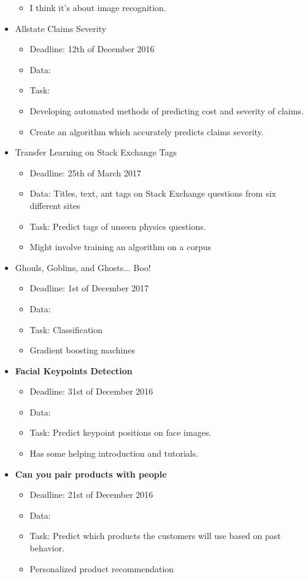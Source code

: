 \documentclass[a4paper,11pt]{article}
\theoremstyle{mytheor}
\begin{document}
\begin{itemize}[noitemsep]
\begin{itemize}[noitemsep]
  \item I think it's about image recognition.
\end{itemize}
\item Allstate Claims Severity
\begin{itemize}[noitemsep]
  \item Deadline: 12th of December 2016
  \item Data:
  \item Task:
  \item Developing automated methods of predicting cost and severity of claims.
  \item Create an algorithm which accurately predicts claims severity.
\end{itemize}

\item Transfer Learning on Stack Exchange Tags
\begin{itemize}[noitemsep]
  \item Deadline: 25th of March 2017
  \item Data: Titles, text, ant tags on Stack Exchange questions from six different sites
  \item Task: Predict tags of unseen physics questions.
  \item Might involve training an algorithm on a corpus
\end{itemize}

\item Ghouls, Goblins, and Ghosts... Boo!
\begin{itemize}[noitemsep]
  \item Deadline: 1st of December 2017
  \item Data: 
  \item Task: Classification 
  \item Gradient boosting machines
\end{itemize}

\item \textbf{Facial Keypoints Detection}
\begin{itemize}[noitemsep]
  \item Deadline: 31st of December 2016
  \item Data: 
  \item Task: Predict keypoint positions on face images. 
  \item Has some helping introduction and tutorials.
\end{itemize}

\item \textbf{Can you pair products with people}
\begin{itemize}[noitemsep]
  \item Deadline: 21st of December 2016
  \item Data: 
  \item Task: Predict which products the customers will use based on past behavior.
  \item Personalized product recommendation
\end{itemize}

\end{itemize}
\end{document}
